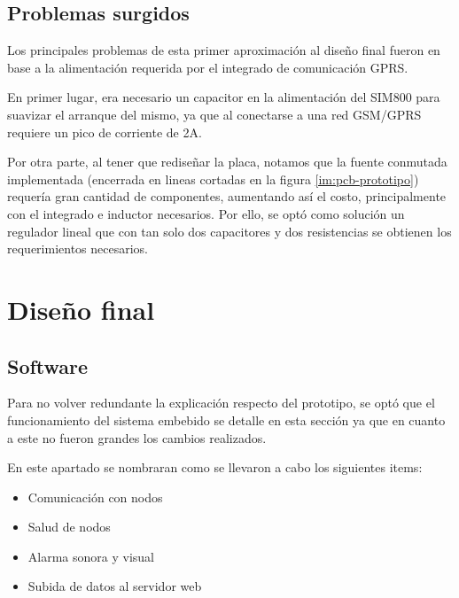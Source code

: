 \subsection{Problemas surgidos}
\par Los principales problemas de esta primer aproximación al diseño final fueron en
base a la alimentación requerida por el integrado de comunicación GPRS.
\par En primer lugar, era necesario un capacitor en la alimentación del SIM800 para
suavizar el arranque del mismo, ya que al conectarse a una red GSM/GPRS requiere un pico
de corriente de 2A.
\par Por otra parte, al tener que rediseñar la placa, notamos que la fuente conmutada implementada (encerrada en lineas cortadas en la figura \ref{im:pcb-prototipo}) requería gran cantidad de componentes, aumentando así el costo, principalmente con el integrado e inductor necesarios. Por ello, se optó como solución un regulador lineal que con tan solo dos capacitores y dos resistencias se obtienen los requerimientos necesarios. 

\section{Diseño final}
\subsection{Software}
\par Para no volver redundante la explicación respecto del prototipo, se optó que el
funcionamiento del sistema embebido se detalle en esta sección ya que en cuanto a este no
fueron grandes los cambios realizados. 
\par En este apartado se nombraran como se llevaron a cabo los siguientes items:
\begin{itemize}
    \item Comunicación con nodos
    \item Salud de nodos
    \item Alarma sonora y visual
    \item Subida de datos al servidor web
\end{itemize}

